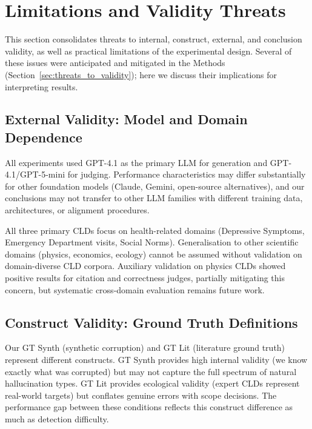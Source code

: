 \section{Limitations and Validity Threats}
\label{sec:discussion_limitations}

This section consolidates threats to internal, construct, external, and conclusion validity, as well as practical limitations of the experimental design. Several of these issues were anticipated and mitigated in the Methods (Section~\ref{sec:threats_to_validity}); here we discuss their implications for interpreting results.

\subsection{External Validity: Model and Domain Dependence}

All experiments used GPT-4.1 as the primary LLM for generation and GPT-4.1/GPT-5-mini for judging. Performance characteristics may differ substantially for other foundation models (Claude, Gemini, open-source alternatives), and our conclusions may not transfer to other LLM families with different training data, architectures, or alignment procedures.

All three primary CLDs focus on health-related domains (Depressive Symptoms, Emergency Department visits, Social Norms). Generalisation to other scientific domains (physics, economics, ecology) cannot be assumed without validation on domain-diverse CLD corpora. Auxiliary validation on physics CLDs showed positive results for citation and correctness judges, partially mitigating this concern, but systematic cross-domain evaluation remains future work.

\subsection{Construct Validity: Ground Truth Definitions}

Our GT Synth (synthetic corruption) and GT Lit (literature ground truth) represent different constructs. GT Synth provides high internal validity (we know exactly what was corrupted) but may not capture the full spectrum of natural hallucination types. GT Lit provides ecological validity (expert CLDs represent real-world targets) but conflates genuine errors with scope decisions. The performance gap between these conditions reflects this construct difference as much as detection difficulty.


